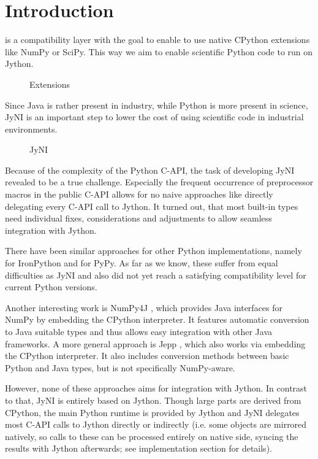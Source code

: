 \documentclass[letterpaper,compsoc,twoside]{IEEEtran}
\begin{document}
\section{Introduction\label{introduction}}


\cite{JyNI} is a compatibility layer with the goal to enable
\cite{JYTHON} to use native CPython extensions like NumPy
or SciPy. This way we aim to enable scientific Python
code to run on Jython.\begin{figure}[]\noindent{}
\caption{Extensions}
\end{figure}

Since Java is rather present in industry, while Python
is more present in science, JyNI is an important step
to lower the cost of using scientific code in industrial
environments.\begin{figure}[]\noindent{}
\caption{JyNI}
\end{figure}

Because of the complexity of the Python C-API, the task of developing JyNI revealed to be a true challenge.
Especially the frequent occurrence of preprocessor macros in the public C-API allows for no naive approaches like directly delegating every C-API call to Jython.
It turned out, that most built-in types need individual fixes, considerations and adjustments to allow seamless integration with Jython.

There have been similar approaches for other Python implementations, namely \cite{IRONCLAD} for IronPython and \cite{CPYEXT} for PyPy.
As far as we know, these suffer from equal difficulties as JyNI and also did not yet reach a satisfying compatibility level for
current Python versions.

Another interesting work is NumPy4J \cite{NP4J}, which provides Java interfaces for NumPy by embedding the CPython interpreter.
It features automatic conversion to Java suitable types and thus allows easy integration with other Java frameworks.
A more general approach is Jepp \cite{JEPP}, which also works via embedding the CPython interpreter.
It also includes conversion methods between basic Python and Java types, but is not specifically NumPy-aware.

However, none of these approaches aims for integration with Jython. In contrast to that, JyNI is entirely based on Jython.
Though large parts are derived from CPython, the main Python runtime is provided by Jython and JyNI delegates most C-API calls
to Jython directly or indirectly (i.e. some objects are mirrored natively, so calls to these can be processed entirely on native side, syncing the results with Jython afterwards; see implementation section for details).
\end{document}
